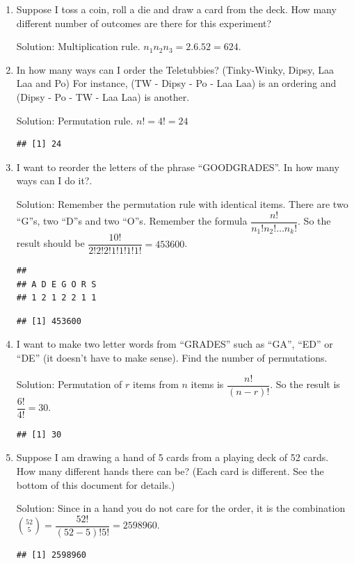 \documentclass[]{book}
\theoremstyle{definition}
\theoremstyle{definition}
\theoremstyle{definition}
\theoremstyle{remark}
\begin{document}
\begin{enumerate}
\def\labelenumi{\arabic{enumi}.}
\item
  Suppose I toss a coin, roll a die and draw a card from the deck. How
  many different number of outcomes are there for this experiment?

  Solution: Multiplication rule. \(n_1n_2n_3 = 2.6.52 = 624\).
\item
  In how many ways can I order the Teletubbies? (Tinky-Winky, Dipsy, Laa
  Laa and Po) For instance, (TW - Dipsy - Po - Laa Laa) is an ordering
  and (Dipsy - Po - TW - Laa Laa) is another.

  Solution: Permutation rule. \(n! = 4! = 24\)

\begin{verbatim}
## [1] 24
\end{verbatim}
\item
  I want to reorder the letters of the phrase ``GOODGRADES''. In how
  many ways can I do it?.

  Solution: Remember the permutation rule with identical items. There
  are two ``G''s, two ``D''s and two ``O''s. Remember the formula
  \(\dfrac{n!}{n_1!n_2!\dots n_k!}\). So the result should be
  \(\dfrac{10!}{2!2!2!1!1!1!1!} = 453600\).

\begin{verbatim}
## 
## A D E G O R S 
## 1 2 1 2 2 1 1
\end{verbatim}

\begin{verbatim}
## [1] 453600
\end{verbatim}
\item
  I want to make two letter words from ``GRADES'' such as ``GA'', ``ED''
  or ``DE'' (it doesn't have to make sense). Find the number of
  permutations.

  Solution: Permutation of \(r\) items from \(n\) items is
  \(\dfrac{n!}{(n-r)!}\). So the result is \(\dfrac{6!}{4!} = 30\).

\begin{verbatim}
## [1] 30
\end{verbatim}
\item
  Suppose I am drawing a hand of 5 cards from a playing deck of 52
  cards. How many different hands there can be? (Each card is different.
  See the bottom of this document for details.)

  Solution: Since in a hand you do not care for the order, it is the
  combination \(\binom{52}{5} = \dfrac{52!}{(52-5)!5!} = 2598960\).

\begin{verbatim}
## [1] 2598960
\end{verbatim}
\end{enumerate}
\end{document}
